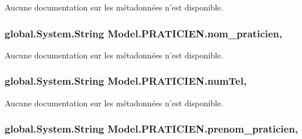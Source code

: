 Aucune documentation sur les métadonnées n'est disponible. 

\hypertarget{class_model_1_1_p_r_a_t_i_c_i_e_n_aebc5f079e73aca7fde020d817a1be78d}{
\subsubsection[{nom\-\_\-praticien}]{\setlength{\rightskip}{0pt plus 5cm}global.\-System.\-String Model.\-P\-R\-A\-T\-I\-C\-I\-E\-N.\-nom\-\_\-praticien\hspace{0.3cm}{\ttfamily [get]}, {\ttfamily [set]}}}\label{class_model_1_1_p_r_a_t_i_c_i_e_n_aebc5f079e73aca7fde020d817a1be78d}


Aucune documentation sur les métadonnées n'est disponible. 

\hypertarget{class_model_1_1_p_r_a_t_i_c_i_e_n_a3182fceec324d9beb52831dd2f36af6f}{
\subsubsection[{num\-Tel}]{\setlength{\rightskip}{0pt plus 5cm}global.\-System.\-String Model.\-P\-R\-A\-T\-I\-C\-I\-E\-N.\-num\-Tel\hspace{0.3cm}{\ttfamily [get]}, {\ttfamily [set]}}}\label{class_model_1_1_p_r_a_t_i_c_i_e_n_a3182fceec324d9beb52831dd2f36af6f}


Aucune documentation sur les métadonnées n'est disponible. 

\hypertarget{class_model_1_1_p_r_a_t_i_c_i_e_n_a2fa0f78d1573fe2d7d39d0a18feced05}{
\subsubsection[{prenom\-\_\-praticien}]{\setlength{\rightskip}{0pt plus 5cm}global.\-System.\-String Model.\-P\-R\-A\-T\-I\-C\-I\-E\-N.\-prenom\-\_\-praticien\hspace{0.3cm}{\ttfamily [get]}, {\ttfamily [set]}}}\label{class_model_1_1_p_r_a_t_i_c_i_e_n_a2fa0f78d1573fe2d7d39d0a18feced05}



